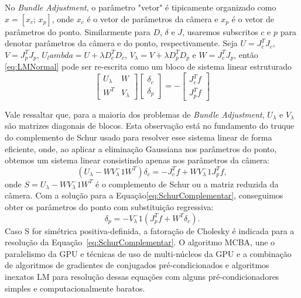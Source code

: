 No \emph{Bundle Adjustment}, o parâmetro "vetor" é tipicamente organizado como
$x = [x_c;\,x_p]$, onde $x_c$ é o vetor de parâmetros da câmera e $x_p$ é o vetor
de parâmetros do ponto. Similarmente para $D$, $\delta$ e $J$, usaremos
subscritos $c$ e $p$ para denotar parâmetros da câmera e do ponto,
respectivamente. 
Seja $U = J_c^T J_c$, $V = J_p^T J_p$, $U_lambda = U + \lambda D_c^T D_c$,
$V_\lambda = V + \lambda D_p^T D_p$ e $W = J_c^T J_p$, então \ref{eq:LMNormal}
pode ser re-escrita como um bloco de sistema linear estruturado
\[
\begin{bmatrix}
U_\lambda & W \\
W^T & V_\lambda 
\end{bmatrix}
\begin{bmatrix}
\delta_c\\ 
\delta_p
\end{bmatrix} =
-\begin{bmatrix}
J_c^T f\\ 
J_p^T f
\end{bmatrix}
\]

Vale ressaltar que, para a maioria dos problemas de \emph{Bundle Adjustment},
$U_\lambda$ e $V_\lambda$ são matrizes diagonais de blocos. Esta observação está
no fundamento do truque do complemento de Schur usado para resolver esse sistema
linear de forma eficiente, onde, ao aplicar a eliminação Gaussiana nos
parâmetros do ponto, obtemos um sistema linear consistindo apenas nos parâmetros
da câmera:
\begin{equation}
\label{eq:SchurComplementar}
(U_\lambda - W V_\lambda^-1 W^T)\delta_c = -J_c^T f + WV_\lambda^-1 J_p^T f,
\end{equation}
onde $S = U_\lambda - W V_\lambda^-1 W^T$ é o complemento de Schur ou a matriz
reduzida da câmera. Com a solução para a Equação\ref{eq:SchurComplementar}, conseguimos obter os parâmetros do ponto com substituição regressiva:
\begin{equation}
\delta_p = -V_\lambda^-1(J_p^T f + W^T \delta_c).
\end{equation}
Caso S for simétrica positiva-definida, a fatoração de Cholesky é indicada para
a resolução da Equação~\ref{eq:SchurComplementar}. 
%
%
%
O algoritmo MCBA, une o paralelismo da GPU e técnicas de uso de multi-núcleos da GPU e a combinação  de algoritmos de gradientes de conjugados pré-condicionados e algoritmos inexatos LM para resolução dessas equações  com alguns pré-condicionadores simples e computacionalmente baratos. 


